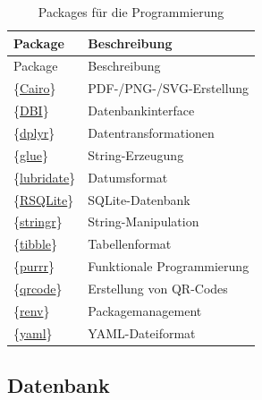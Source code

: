 \documentclass[
]{article}
\begin{document}
\begin{longtable}[]{@{}ll@{}}
\caption{\label{tab:pkg-programming} Packages für die Programmierung}\tabularnewline
\toprule
Package & Beschreibung \\
\midrule
\endfirsthead
\toprule
Package & Beschreibung \\
\midrule
\endhead
\{\href{https://cran.r-project.org/web/packages/Cairo/index.html}{Cairo}\} \autocite{R-Cairo} & PDF-/PNG-/SVG-Erstellung \\
\{\href{https://cran.r-project.org/web/packages/DBI/index.html}{DBI}\} \autocite{R-DBI} & Datenbankinterface \\
\{\href{https://cran.r-project.org/web/packages/dplyr/index.html}{dplyr}\} \autocite{R-dplyr} & Datentransformationen \\
\{\href{https://cran.r-project.org/web/packages/glue/index.html}{glue}\} \autocite{R-glue} & String-Erzeugung \\
\{\href{https://cran.r-project.org/web/packages/lubridate/index.html}{lubridate}\} \autocite{R-lubridate} & Datumsformat \\
\{\href{https://cran.r-project.org/web/packages/RSQLite/index.html}{RSQLite}\} \autocite{R-RSQLite} & SQLite-Datenbank \\
\{\href{https://cran.r-project.org/web/packages/stringr/index.html}{stringr}\} \autocite{R-stringr} & String-Manipulation \\
\{\href{https://cran.r-project.org/web/packages/tibble/index.html}{tibble}\} \autocite{R-tibble} & Tabellenformat \\
\{\href{https://cran.r-project.org/web/packages/purrr/index.html}{purrr}\} \autocite{R-purrr} & Funktionale Programmierung \\
\{\href{https://cran.r-project.org/web/packages/qrcode/index.html}{qrcode}\} \autocite{R-qrcode} & Erstellung von QR-Codes \\
\{\href{https://cran.r-project.org/web/packages/renv/index.html}{renv}\} \autocite{R-renv} & Packagemanagement \\
\{\href{https://cran.r-project.org/web/packages/yaml/index.html}{yaml}\} \autocite{R-yaml} & YAML-Dateiformat \\
\bottomrule
\end{longtable}

\hypertarget{datenbank-1}{%
\subsection{Datenbank}\label{datenbank-1}}
\end{document}
